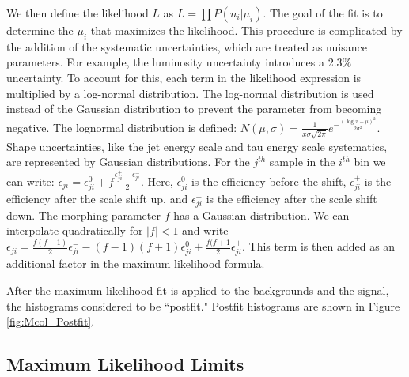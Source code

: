 \documentclass[oneside, letterpaper, oldfontcommands]{memoir}
\begin{document}
\qquad We then define the likelihood $L$ as $L =  \prod P(n_{i}|\mu_{i})$. The goal of the fit is to determine the $\mu_{i}$ that maximizes the likelihood. This procedure is complicated by the addition of the systematic uncertainties, which are treated as nuisance parameters. For example, the luminosity uncertainty\cite{CMS:2011aa} introduces a  2.3\% uncertainty. To account for this, each term in the likelihood expression is multiplied by a log-normal distribution. The log-normal distribution is used instead of the Gaussian distribution to prevent the parameter from becoming negative. 
The lognormal distribution is defined: $N(\mu,\sigma) = \frac{1}{x\sigma \sqrt{2\pi}}e^{-\frac{(\log x - \mu)^{2}}{2\sigma^{2}}}$. 
Shape uncertainties, like the jet energy scale and tau energy scale systematics, are represented by Gaussian distributions. For the $j^{th}$ sample in the $i^{th}$ bin we can write: $\epsilon_{ji} = \epsilon_{ji}^{0} + f \frac{\epsilon_{ji}^{+} - \epsilon_{ji}^{-}}{2}$. Here, $\epsilon_{ji}^{0}$ is the efficiency before the shift, $\epsilon_{ji}^{+}$ is the efficiency after the scale shift up, and $\epsilon_{ji}^{-}$ is the efficiency after the scale shift down. 
The morphing parameter $f$ has a Gaussian distribution. We can interpolate quadratically for $|f|<1$ and write $\epsilon_{ji} = \frac{f (f-1)}{2} \epsilon_{ji}^{-} - (f - 1)(f + 1)\epsilon_{ji}^{0}+\frac{f(f+1}{2}\epsilon_{ji}^{+}$. This term is then added as an additional factor in the maximum likelihood formula. 

\qquad After the maximum likelihood fit is applied to the backgrounds and the signal, the histograms considered to be ``postfit." Postfit histograms are shown in Figure \ref{fig:Mcol_Postfit}. 

\subsection{Maximum Likelihood Limits}
\end{document}
